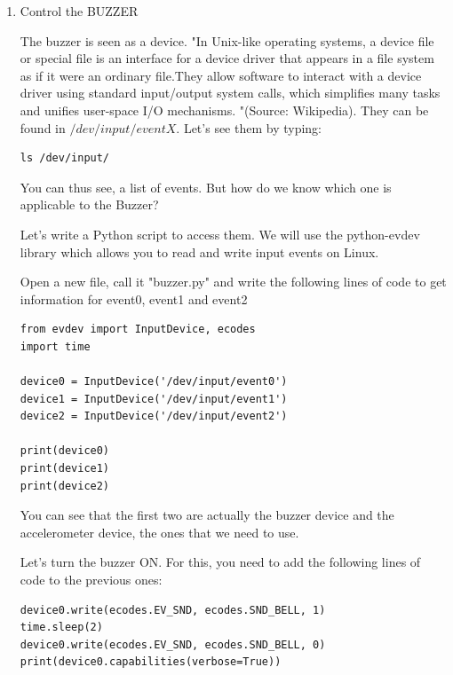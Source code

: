 \begin{enumerate}
\item Control the BUZZER

The buzzer is seen as a device. "In Unix-like operating systems, a device file or special file is an interface for a device driver that appears in a file system as if it were an ordinary file.They allow software to interact with a device driver using standard input/output system calls, which simplifies many tasks and unifies user-space I/O mechanisms. "(Source: Wikipedia). They can be found in $/dev/input/eventX$. Let's see them by typing:

   \begin{tcolorbox}
        \begin{verbatim}
ls /dev/input/
        \end{verbatim}
    \end{tcolorbox}

You can thus see, a list of events. But how do we know which one is applicable to the Buzzer?

Let's write a Python script to access them. We will use the python-evdev library which allows you to read and write input events on Linux.

Open a new file, call it "buzzer.py" and write the following lines of code to get information for event0, event1 and event2

   \begin{tcolorbox}
        \begin{verbatim}
from evdev import InputDevice, ecodes
import time

device0 = InputDevice('/dev/input/event0')
device1 = InputDevice('/dev/input/event1')
device2 = InputDevice('/dev/input/event2')

print(device0)
print(device1)
print(device2)
        \end{verbatim}
    \end{tcolorbox}


You can  see that the first two are actually the buzzer device and the accelerometer device, the ones that we need to use.

Let's turn the buzzer ON. For this, you need to add the following lines of code to the previous ones:

   \begin{tcolorbox}
        \begin{verbatim}
device0.write(ecodes.EV_SND, ecodes.SND_BELL, 1)
time.sleep(2)
device0.write(ecodes.EV_SND, ecodes.SND_BELL, 0)
print(device0.capabilities(verbose=True))
        \end{verbatim}
    \end{tcolorbox}



\end{enumerate}
